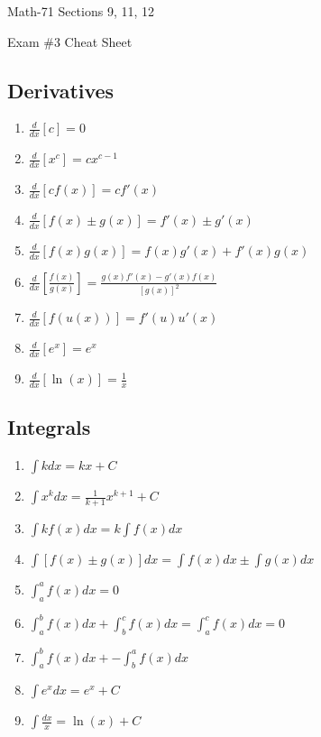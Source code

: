 \documentclass[letterpaper,12pt,fleqn]{article}
\begin{document}
\begin{center}
  \large
  Math-71 Sections 9, 11, 12

  \Large
  Exam \#3 Cheat Sheet
\end{center}

\vspace{0.25in}

\begin{minipage}[t]{3in}
  \subsection*{Derivatives}

  \begin{enumerate}[left=0pt]
    \setlength{\itemsep}{5pt}
  \item \(\displaystyle\frac{d}{dx}[c]=0\)
  \item \(\displaystyle\frac{d}{dx}[x^c]=cx^{c-1}\)
  \item \(\displaystyle\frac{d}{dx}[cf(x)]=cf'(x)\)
  \item \(\displaystyle\frac{d}{dx}[f(x)\pm g(x)]=f'(x)\pm g'(x)\)
  \item \(\displaystyle\frac{d}{dx}[f(x)g(x)]=f(x)g'(x)+f'(x)g(x)\)
  \item \(\displaystyle\frac{d}{dx}\left[\frac{f(x)}{g(x)}\right]=\frac{g(x)f'(x)-g'(x)f(x)}{[g(x)]^2}\)
  \item \(\displaystyle\frac{d}{dx}[f(u(x))]=f'(u)u'(x)\)
  \item \(\displaystyle\frac{d}{dx}[e^x]=e^x\)
  \item \(\displaystyle\frac{d}{dx}[\ln(x)]=\frac{1}{x}\)
  \end{enumerate}
\end{minipage}
\begin{minipage}[t]{3.5in}
  \subsection*{Integrals}

  \begin{enumerate}[left=0pt]
    \setlength{\itemsep}{5pt}
  \item \(\displaystyle\int kdx=kx+C\)
  \item \(\displaystyle\int x^kdx=\frac{1}{k+1}x^{k+1}+C\)
  \item \(\displaystyle\int kf(x)dx=k\int f(x)dx\)
  \item \(\displaystyle\int[f(x)\pm g(x)]dx=\int f(x)dx\pm\int g(x)dx\)
  \item \(\displaystyle\int_a^af(x)dx=0\)
  \item \(\displaystyle\int_a^bf(x)dx+\int_b^cf(x)dx=\int_a^cf(x)dx=0\)
  \item \(\displaystyle\int_a^bf(x)dx+-\int_b^af(x)dx\)
  \item \(\displaystyle\int e^xdx=e^x+C\)
  \item \(\displaystyle\int \frac{dx}{x}=\ln(x)+C\)
  \end{enumerate}
\end{minipage}
\end{document}
